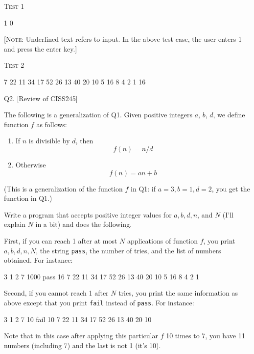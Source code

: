 \textsc{Test 1}
\begin{console}[frame=single, fontsize=\footnotesize,commandchars=\\\{\}]
1 0
\end{console}
[\textsc{Note}: Underlined text refers to input. 
In the above test case, the user enters 1 and press the enter key.]

\textsc{Test 2}
\begin{console}[frame=single,fontsize=\footnotesize,commandchars=\\\{\}]
7 22 11 34 17 52 26 13 40 20 10 5 16 8 4 2 1 16
\end{console}


\newpage
Q2. [Review of CISS245]

The following is a generalization of Q1. 
Given positive integers $a$, $b$, $d$, we define function $f$ as
follows:
\begin{enumerate}
\item If $n$ is divisible by $d$, then
\[
f(n) = n/d
\]
\item Otherwise
\[
f(n) = an + b
\]
\end{enumerate}
(This is a generalization of the function $f$ in Q1: 
if $a=3, b=1, d=2$, you get the function in Q1.)

Write a program that accepts positive integer values for $a, b, d, n$, and 
$N$ (I'll explain $N$ in a bit) and
does the following.

First, if you can reach 1 after at most $N$ applications of function $f$, 
you print $a, b, d, n, N$, the string \verb!pass!, 
the number of tries, 
and the list of numbers obtained. For instance:
\begin{console}[frame=single,fontsize=\footnotesize, commandchars=\\\{\}]
3 1 2 7 1000 pass 16 7 22 11 34 17 52 26 13 40 20 10 5 16 8 4 2 1
\end{console}

Second, if you cannot reach 1 after $N$ tries, 
you print the same information as above except that
you print \verb!fail! instead of \texttt{pass}. For instance:
\begin{console}[frame=single,fontsize=\footnotesize, commandchars=\\\{\}]
3 1 2 7 10 fail 10 7 22 11 34 17 52 26 13 40 20 10
\end{console}

Note that in this case after applying this particular $f$ 10 times to 7, 
you have 11 numbers (including 7)
and the last is not 1 (it's 10).

